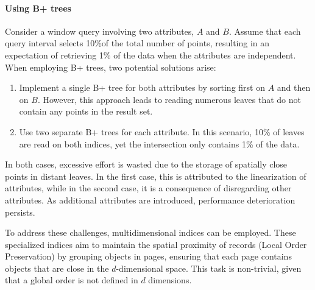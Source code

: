 \paragraph*{Using B+ trees}
Consider a window query involving two attributes, $A$ and $B$.
Assume that each query interval selects 10\%of the total number of points, resulting in an expectation of retrieving 1\% of the data when the attributes are independent.
When employing B+ trees, two potential solutions arise:
\begin{enumerate}
    \item Implement a single B+ tree for both attributes by sorting first on $A$ and then on $B$. 
        However, this approach leads to reading numerous leaves that do not contain any points in the result set.
    \item Use two separate B+ trees for each attribute. 
        In this scenario, 10\% of leaves are read on both indices, yet the intersection only contains 1\% of the data.
\end{enumerate}
In both cases, excessive effort is wasted due to the storage of spatially close points in distant leaves.
In the first case, this is attributed to the linearization of attributes, while in the second case, it is a consequence of disregarding other attributes.
As additional attributes are introduced, performance deterioration persists.

To address these challenges, multidimensional indices can be employed.
These specialized indices aim to maintain the spatial proximity of records (Local Order Preservation) by grouping objects in pages, ensuring that each page contains objects that are close in the $d$-dimensional space.
This task is non-trivial, given that a global order is not defined in $d$ dimensions.